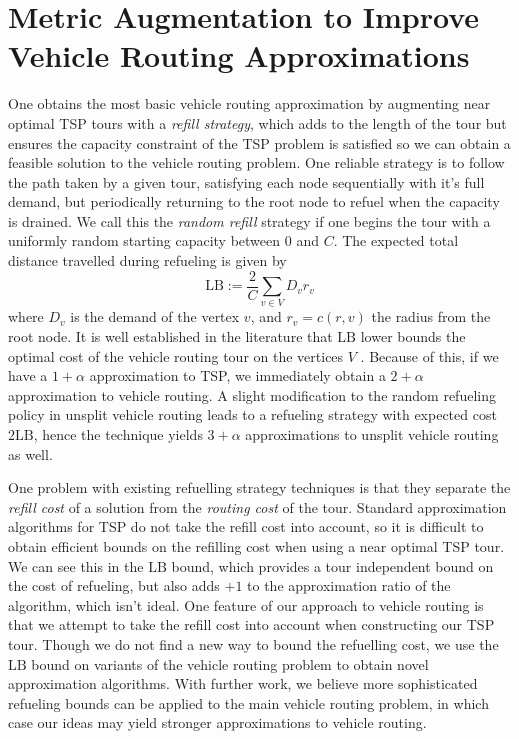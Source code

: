 \documentclass{article}
\theoremstyle{plain}
\theoremstyle{plain}
\begin{document}
\part{Metric Augmentation to Improve Vehicle Routing Approximations}

One obtains the most basic vehicle routing approximation by augmenting near optimal TSP tours with a {\it refill strategy}, which adds to the length of the tour but ensures the capacity constraint of the TSP problem is satisfied so we can obtain a feasible solution to the vehicle routing problem. One reliable strategy is to follow the path taken by a given tour, satisfying each node sequentially with it's full demand, but periodically returning to the root node to refuel when the capacity is drained. We call this the {\it random refill} strategy if one begins the tour with a uniformly random starting capacity between $0$ and $C$. The expected total distance travelled during refueling is given by
%
\[ \text{LB} := \frac{2}{C} \sum_{v \in V} D_v r_v \]
%
where $D_v$ is the demand of the vertex $v$, and $r_v = c(r,v)$ the radius from the root node. It is well established in the literature that $\text{LB}$ lower bounds the optimal cost of the vehicle routing tour on the vertices $V$ \cite{RandomRefillPaper}. Because of this, if we have a $1 + \alpha$ approximation to TSP, we immediately obtain a $2 + \alpha$ approximation to vehicle routing. A slight modification to the random refueling policy in unsplit vehicle routing leads to a refueling strategy with expected cost $2 \text{LB}$, hence the technique yields $3 + \alpha$ approximations to unsplit vehicle routing as well.

One problem with existing refuelling strategy techniques is that they separate the {\it refill cost} of a solution from the {\it routing cost} of the tour. Standard approximation algorithms for TSP do not take the refill cost into account, so it is difficult to obtain efficient bounds on the refilling cost when using a near optimal TSP tour. We can see this in the $\text{LB}$ bound, which provides a tour independent bound on the cost of refueling, but also adds $+1$ to the approximation ratio of the algorithm, which isn't ideal. One feature of our approach to vehicle routing is that we attempt to take the refill cost into account when constructing our TSP tour. Though we do not find a new way to bound the refuelling cost, we use the $\text{LB}$ bound on variants of the vehicle routing problem to obtain novel approximation algorithms. With further work, we believe more sophisticated refueling bounds can be applied to the main vehicle routing problem, in which case our ideas may yield stronger approximations to vehicle routing.
\end{document}
